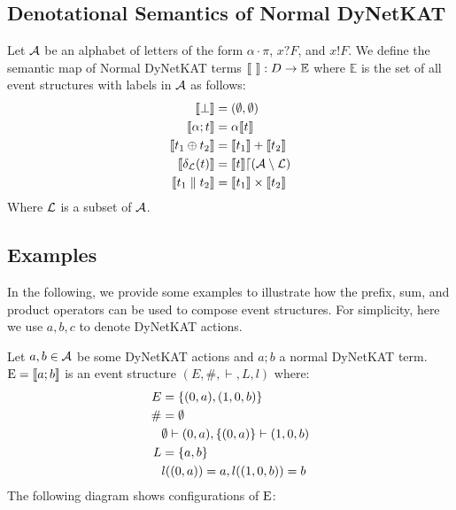 \subsection{Denotational Semantics of Normal DyNetKAT}

\begin{definition}
    Let $\mathcal{A}$ be an alphabet of letters of the form
    $\alpha \cdot \pi$,
    $x?F$, and $x!F$.
    We define the semantic map of Normal DyNetKAT terms
    $\llbracket  \  \rrbracket: D \rightarrow \mathbb{E}$ where
    $\mathbb{E}$ is the set of all event structures with
    labels in $\mathcal{A}$ as follows:
    \begin{align*}
        \llbracket \bot \rrbracket      & = (\emptyset,\emptyset)                  \\
        \llbracket \alpha; t \rrbracket & = \alpha\llbracket t \rrbracket                        \\
        \llbracket t_1 \oplus t_2 \rrbracket
                        & = \llbracket t_1 \rrbracket + \llbracket t_2 \rrbracket                  \\
        \llbracket \delta_{\mathcal{L}}(t) \rrbracket
                        & = \llbracket t \rrbracket \lceil (\mathcal{A} \setminus \mathcal{L}) \\
        \llbracket t_1 \parallel t_2 \rrbracket
                        & = \llbracket t_1 \rrbracket \times \llbracket t_2 \rrbracket
    \end{align*}
    Where $\mathcal{L}$ is a subset of $\mathcal{A}$.
\end{definition}

\subsection{Examples}
In the following, we provide some examples to illustrate
how the prefix, sum, and product operators can be used to 
compose event structures.
For simplicity, here we use $a,b,c$ to denote DyNetKAT actions.

\begin{example}
    Let $a,b\in \mathcal{A}$ be some DyNetKAT actions and $a;b$ a
    normal DyNetKAT term.
    $\mathrm{E} = \llbracket a;b \rrbracket$ is an event structure
    $(E,\#,\vdash,L,l)$ where:
    \begin{align*}
        E  & = \{(0,a),(1,0,b)\}                       \\
        \# & = \emptyset                               \\
           & \emptyset \vdash (0,a), \{(0,a)\} \vdash (1,0,b) \\
        L  & = \{a,b\}                                 \\
           & l((0,a)) = a, l((1,0,b)) = b              
    \end{align*}
    The following diagram shows configurations of $\mathrm{E}$:
    \begin{center}
    \end{center}
\end{example}

